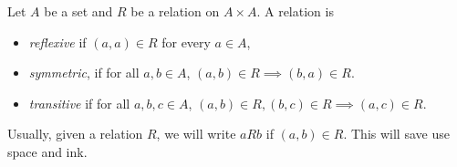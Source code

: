 \begin{definition}
Let $A$ be a set and $R$ be a relation on $A \times A$. A relation is
\begin{itemize}
    \item \textit{reflexive} if $(a, a) \in R$ for every $a \in A$,
    \item \textit{symmetric}, if for all $a, b \in A$, $(a, b) \in R \implies (b, a) \in R$.
    \item \textit{transitive} if for all $a, b, c \in A$, $(a, b) \in R, (b, c) \in R \implies (a, c) \in R$.
\end{itemize}

Usually, given a relation $R$, we will write $aRb$ if $(a, b) \in R$. This will save use space and ink.

\end{definition}

